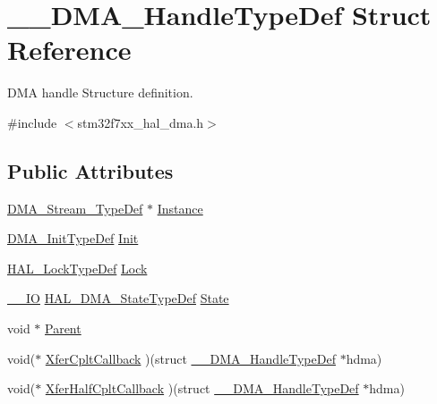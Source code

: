\hypertarget{struct_____d_m_a___handle_type_def}{}\section{\+\_\+\+\_\+\+D\+M\+A\+\_\+\+Handle\+Type\+Def Struct Reference}
\label{struct_____d_m_a___handle_type_def}


D\+MA handle Structure definition.  




{\ttfamily \#include $<$stm32f7xx\+\_\+hal\+\_\+dma.\+h$>$}

\subsection*{Public Attributes}
\begin{DoxyCompactItemize}
\item 
\mbox{\hyperlink{struct_d_m_a___stream___type_def}{D\+M\+A\+\_\+\+Stream\+\_\+\+Type\+Def}} $\ast$ \mbox{\hyperlink{struct_____d_m_a___handle_type_def_ac4b645b1c2beb1107dbec7dae98747e1}{Instance}}
\item 
\mbox{\hyperlink{struct_d_m_a___init_type_def}{D\+M\+A\+\_\+\+Init\+Type\+Def}} \mbox{\hyperlink{struct_____d_m_a___handle_type_def_a3792cb34cedb0e2ab204e41b53ef75ad}{Init}}
\item 
\mbox{\hyperlink{stm32f7xx__hal__def_8h_ab367482e943333a1299294eadaad284b}{H\+A\+L\+\_\+\+Lock\+Type\+Def}} \mbox{\hyperlink{struct_____d_m_a___handle_type_def_a005e867f695aa4b85aca665af7345b51}{Lock}}
\item 
\mbox{\hyperlink{core__sc300_8h_aec43007d9998a0a0e01faede4133d6be}{\+\_\+\+\_\+\+IO}} \mbox{\hyperlink{group___d_m_a___exported___types_ga9c012af359987a240826f29073bbe463}{H\+A\+L\+\_\+\+D\+M\+A\+\_\+\+State\+Type\+Def}} \mbox{\hyperlink{struct_____d_m_a___handle_type_def_a9759b676141bec799cdab94c3e08e6e4}{State}}
\item 
void $\ast$ \mbox{\hyperlink{struct_____d_m_a___handle_type_def_af42684decd26b1c5d49a529fcf99be30}{Parent}}
\item 
void($\ast$ \mbox{\hyperlink{struct_____d_m_a___handle_type_def_a4f323d8234b3f5f454a639e9df3cba23}{Xfer\+Cplt\+Callback}} )(struct \mbox{\hyperlink{struct_____d_m_a___handle_type_def}{\+\_\+\+\_\+\+D\+M\+A\+\_\+\+Handle\+Type\+Def}} $\ast$hdma)
\item 
void($\ast$ \mbox{\hyperlink{struct_____d_m_a___handle_type_def_a2e343c6a9135222a8efb8ca5bb5dad8c}{Xfer\+Half\+Cplt\+Callback}} )(struct \mbox{\hyperlink{struct_____d_m_a___handle_type_def}{\+\_\+\+\_\+\+D\+M\+A\+\_\+\+Handle\+Type\+Def}} $\ast$hdma)

\end{DoxyCompactItemize}
